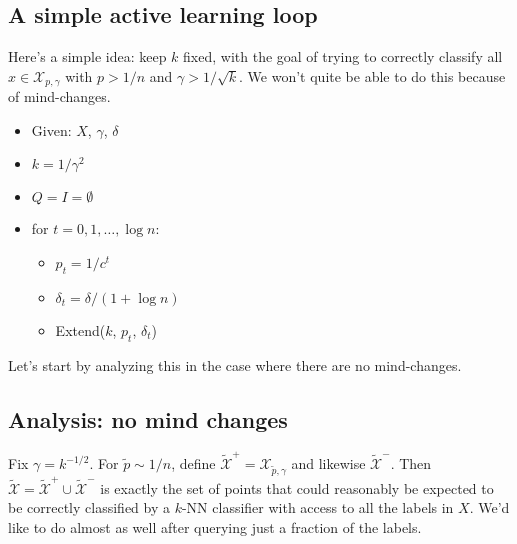 \documentclass{article}
\def\X{{\mathcal X}}
\begin{document}
\subsection{A simple active learning loop}

Here's a simple idea: keep $k$ fixed, with the goal of trying to correctly classify all $x \in \X_{p,\gamma}$ with $p > 1/n$ and $\gamma > 1/\sqrt{k}$. We won't quite be able to do this because of mind-changes.

\begin{itemize}
\item Given: $X$, $\gamma$, $\delta$
\item $k = 1/\gamma^2$
\item $Q = I = \emptyset$
\item for $t = 0, 1, \ldots, \log n$:
\begin{itemize}
\item $p_t = 1/c^t$
\item $\delta_t = \delta/(1 + \log n)$
\item Extend($k$, $p_t$, $\delta_t$)
\end{itemize}
\end{itemize}

Let's start by analyzing this in the case where there are no mind-changes.

\subsection{Analysis: no mind changes}

Fix $\gamma = k^{-1/2}$. For $\tilde{p} \sim 1/n$, define $\widetilde{\X}^+ = \X_{\tilde{p}, \gamma}$ and likewise $\widetilde{\X}^-$. Then $\widetilde{\X} = \widetilde{\X}^+ \cup \widetilde{\X}^-$ is exactly the set of points that could reasonably be expected to be correctly classified by a $k$-NN classifier with access to all the labels in $X$. We'd like to do almost as well after querying just a fraction of the labels.
\end{document}
